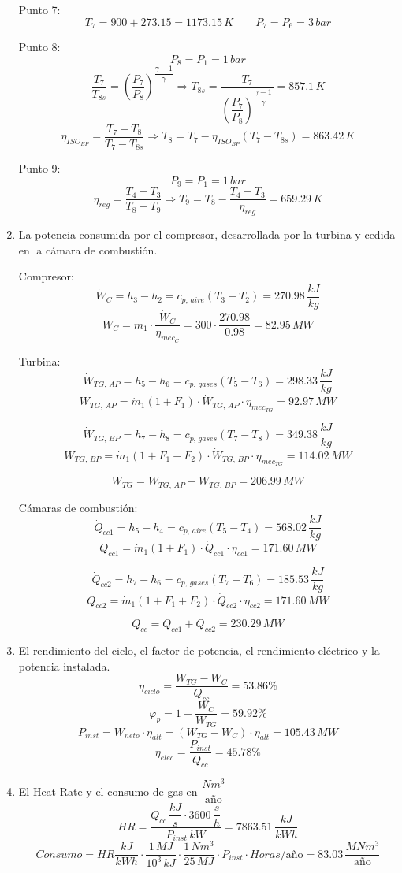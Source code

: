 \begin{enumerate}
				Punto 7:
				\[T_7 = 900 + 273.15 = 1173.15\,K \qquad P_7 = P_6 = 3\,bar\]
				
				Punto 8:
				\[P_8 = P_1 = 1\,bar\]
				\[\dfrac{T_7}{T_{8s}} = \left(\dfrac{P_7}{P_8}\right)^{\dfrac{\gamma - 1}{\gamma}} \Rightarrow T_{8s} = \dfrac{T_7}{\left(\dfrac{P_7}{P_8}\right)^{\dfrac{\gamma - 1}{\gamma}}} = 857.1\,K\]
				\[\eta_{ISO_{BP}} = \dfrac{T_7 - T_8}{T_7 - T_{8s}} \Rightarrow T_8 = T_7 - \eta_{ISO_{BP}}(T_7 - T_{8s}) = 863.42\,K\]
				
				Punto 9:
				\[P_9 = P_1 = 1\,bar\]
				\[\eta_{reg} = \dfrac{T_4 - T_3}{T_8 - T_9} \Rightarrow T_9 = T_8 - \dfrac{T_4 - T_3}{\eta_{reg}} = 659.29\,K\]
				
			\item La potencia consumida por el compresor, desarrollada por la turbina y cedida en la cámara de combustión.
			
			
				Compresor:
				\[\dot W_C = h_3 - h_2 = c_{p,\,aire}(T_3 - T_2) = 270.98\,\dfrac{kJ}{kg}\]
				\[W_C = \dot m_1 \cdot \dfrac{\dot W_C}{\eta_{mec_C}} = 300 \cdot \dfrac{270.98}{0.98} = 82.95\,MW\]
				
				Turbina:
				\[\dot W_{TG,\,AP} = h_5 - h_6 = c_{p,\,gases}(T_5 - T_6) = 298.33\,\dfrac{kJ}{kg}\]
				\[W_{TG,\,AP} = \dot m_{1}(1+F_1) \cdot \dot W_{TG,\,AP}\cdot \eta_{mec_{TG}} = 92.97\,MW\]
				
				\[\dot W_{TG,\,BP} = h_7 - h_8 = c_{p,\,gases}(T_7 - T_8) = 349.38\,\dfrac{kJ}{kg}\]
				\[W_{TG,\,BP} = \dot m_{1}(1+F_1+F_2) \cdot \dot W_{TG,\,BP}\cdot \eta_{mec_{TG}} = 114.02\,MW\]
				
				\[W_{TG} = W_{TG,\,AP} + W_{TG,\,BP} = 206.99\,MW\]
				
				Cámaras de combustión:
				\[\dot Q_{cc1} = h_5 - h_4 = c_{p,\,aire}(T_5 - T_4) = 568.02\,\dfrac{kJ}{kg}\]
				\[Q_{cc1} = \dot m_1 (1+F_1)\cdot \dot Q_{cc1} \cdot \eta_{cc1} = 171.60\,MW\]
				
				\[\dot Q_{cc2} = h_7 - h_6 = c_{p,\,gases}(T_7 - T_6) = 185.53\,\dfrac{kJ}{kg}\]
				\[Q_{cc2} = \dot m_1 (1+F_1+F_2)\cdot \dot Q_{cc2} \cdot \eta_{cc2} = 171.60\,MW\]
				
				\[Q_{cc} = Q_{cc1} + Q_{cc2} = 230.29\,MW\]
				
			\item El rendimiento del ciclo, el factor de potencia, el rendimiento eléctrico y la potencia instalada.
				\[\eta_{ciclo} = \dfrac{W_{TG} - W_C}{Q_{cc}} = 53.86\%\]
				\[\varphi_p = 1-\dfrac{W_C}{W_{TG}} = 59.92\%\]
				\[P_{inst} = W_{neto} \cdot \eta_{alt} = (W_{TG} - W_C)\cdot \eta_{alt} = 105.43\,MW\]
				\[\eta_{elec} = \dfrac{P_{inst}}{Q_{cc}} = 45.78\%\]
				
			\item El Heat Rate y el consumo de gas en $\dfrac{Nm^3}{\text{año}}$
				\[HR = \dfrac{Q_{cc}\,\dfrac{kJ}{s}\cdot 3600\,\dfrac{s}{h}}{P_{inst}\,kW} = 7863.51\,\dfrac{kJ}{kWh}\]
				\[Consumo = HR \dfrac{kJ}{kWh}\cdot \dfrac{1\,MJ}{10^3\,kJ}\cdot \dfrac{1\,Nm^3}{25\,MJ} \cdot P_{inst} \cdot Horas/\text{año} = 83.03\,\dfrac{MNm^3}{\text{año}} \]
			
		\end{enumerate}